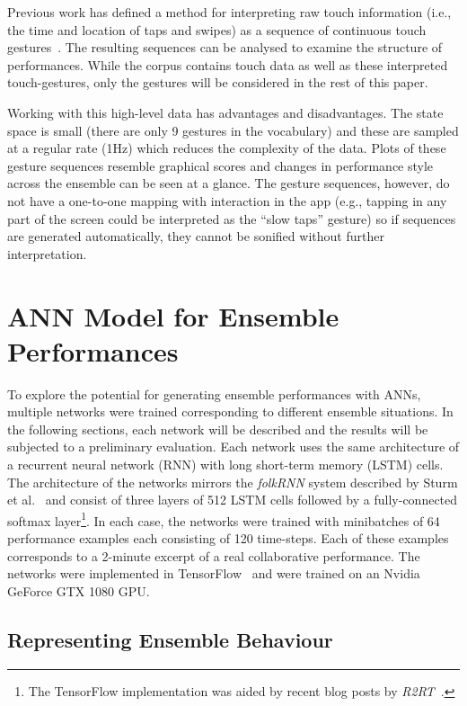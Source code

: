 \documentclass{article}
\begin{document}
Previous work has defined a method for interpreting raw touch
information (i.e., the time and location of taps and swipes) as a
sequence of continuous touch gestures~\cite{Martin:2015jk}. The
resulting sequences can be analysed to examine the structure of
performances. While the corpus contains touch data as well as these
interpreted touch-gestures, only the gestures will be considered in
the rest of this paper.

Working with this high-level data has advantages and disadvantages.
The state space is small (there are only 9 gestures in the vocabulary)
and these are sampled at a regular rate (1Hz) which reduces the
complexity of the data. Plots of these gesture sequences resemble
graphical scores and changes in performance style across the ensemble
can be seen at a glance. The gesture sequences, however, do not have a
one-to-one mapping with interaction in the app (e.g., tapping in any
part of the screen could be interpreted as the ``slow taps'' gesture)
so if sequences are generated automatically, they cannot be sonified
without further interpretation.

\section{ANN Model for Ensemble Performances}

To explore the potential for generating ensemble performances with
ANNs, multiple networks were trained corresponding to different
ensemble situations. In the following sections, each network will be
described and the results will be subjected to a preliminary
evaluation. Each network uses the same architecture of a recurrent
neural network (RNN) with long short-term memory (LSTM) cells. The
architecture of the networks mirrors the \emph{folkRNN} system
described by Sturm et al.~\cite{Sturm:2016rz} and consist of three
layers of 512 LSTM cells followed by a fully-connected softmax
layer\footnote{The TensorFlow implementation was aided by recent blog
  posts by \emph{R2RT}~\cite{R2RT-RNN:2016}.}. In each case, the
networks were trained with minibatches of 64 performance examples each
consisting of 120 time-steps. Each of these examples corresponds to a
2-minute excerpt of a real collaborative performance. The networks
were implemented in TensorFlow~\cite{Abadi:2016wd} and were trained on
an Nvidia GeForce GTX 1080 GPU.

\subsection{Representing Ensemble Behaviour}
\end{document}
